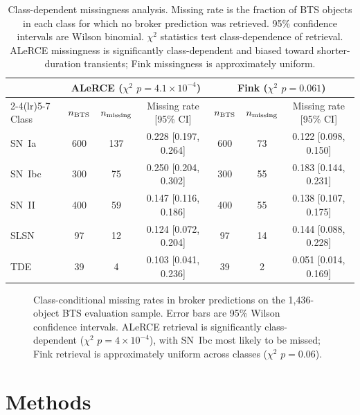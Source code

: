\documentclass[twocolumn]{aastex631}
\begin{document}
\begin{table}[t]
\centering
\caption{Class-dependent missingness analysis. Missing rate is the
fraction of BTS objects in each class for which no broker prediction
was retrieved. 95\% confidence intervals are Wilson binomial.
$\chi^2$ statistics test class-dependence of retrieval. ALeRCE missingness
is significantly class-dependent and biased toward shorter-duration
transients; Fink missingness is approximately uniform.
\label{tab:missingness}}
\begin{tabular}{lcccccc}
\toprule
 & \multicolumn{3}{c}{ALeRCE ($\chi^2$ $p = 4.1 \times 10^{-4}$)}
 & \multicolumn{3}{c}{Fink ($\chi^2$ $p = 0.061$)} \\
\cmidrule(lr){2-4}\cmidrule(lr){5-7}
Class & $n_{\rm BTS}$ & $n_{\rm missing}$ & Missing rate [95\% CI]
& $n_{\rm BTS}$ & $n_{\rm missing}$ & Missing rate [95\% CI] \\
\midrule
SN~Ia  & 600 & 137 & 0.228 [0.197, 0.264] & 600 & 73 & 0.122 [0.098, 0.150] \\
SN~Ibc & 300 &  75 & 0.250 [0.204, 0.302] & 300 & 55 & 0.183 [0.144, 0.231] \\
SN~II  & 400 &  59 & 0.147 [0.116, 0.186] & 400 & 55 & 0.138 [0.107, 0.175] \\
SLSN   &  97 &  12 & 0.124 [0.072, 0.204] &  97 & 14 & 0.144 [0.088, 0.228] \\
TDE    &  39 &   4 & 0.103 [0.041, 0.236] &  39 &  2 & 0.051 [0.014, 0.169] \\
\bottomrule
\end{tabular}
\end{table}

\begin{figure}[t]
\caption{Class-conditional missing rates in broker predictions on the
1{,}436-object BTS evaluation sample. Error bars are 95\% Wilson
confidence intervals. ALeRCE retrieval is significantly class-dependent
($\chi^2$ $p = 4 \times 10^{-4}$), with SN~Ibc most likely to be missed;
Fink retrieval is approximately uniform across classes
($\chi^2$ $p = 0.06$). \label{fig:missingness}}
\end{figure}


\section{Methods} \label{sec:methods}
\end{document}

